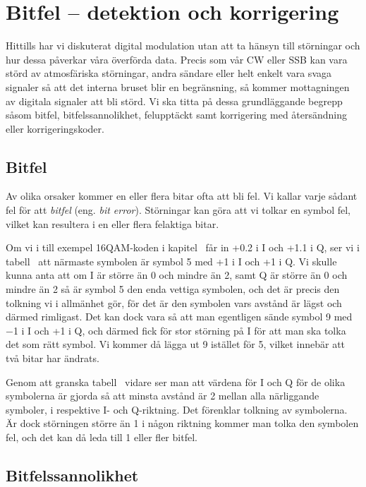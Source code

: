 \section{Bitfel -- detektion och korrigering}

Hittills har vi diskuterat digital modulation utan att ta hänsyn till störningar
och hur dessa påverkar våra överförda data.
Precis som vår CW eller SSB kan vara störd av atmosfäriska störningar, andra
sändare eller helt enkelt vara svaga signaler så att det interna bruset blir en
begränsning, så kommer mottagningen av digitala signaler att bli störd.
Vi ska titta på dessa grundläggande begrepp såsom bitfel, bitfelssannolikhet,
felupptäckt samt korrigering med återsändning eller korrigeringskoder.

\subsection{Bitfel}

Av olika orsaker kommer en eller flera bitar ofta att bli fel.
Vi kallar varje sådant fel för att \emph{bitfel} (eng. \emph{bit error}).
Störningar kan göra att vi tolkar en symbol fel, vilket kan resultera i en eller
flera felaktiga bitar.

Om vi i till exempel 16QAM-koden i kapitel~ får in +0.2 i I och +1.1
i Q, ser vi i tabell~ att närmaste symbolen är symbol 5 med +1
i I och +1 i Q.
Vi skulle kunna anta att om I är större än 0 och mindre än 2, samt Q är större
än 0 och mindre än 2 så är symbol 5 den enda vettiga symbolen, och det är precis
den tolkning vi i allmänhet gör, för det är den symbolen vars avstånd är lägst
och därmed rimligast.
Det kan dock vara så att man egentligen sände symbol 9 med \num{-1} i I och +1 i
Q, och därmed fick för stor störning på I för att man ska tolka det som rätt
symbol.
Vi kommer då lägga ut 9 istället för 5, vilket innebär att två bitar har
ändrats.

Genom att granska tabell~ vidare ser man att värdena för
I och Q för de olika symbolerna är gjorda så att minsta avstånd är 2 mellan
alla närliggande symboler, i respektive I- och Q-riktning.
Det förenklar tolkning av symbolerna.
Är dock störningen större än 1 i någon riktning kommer man tolka den symbolen
fel, och det kan då leda till 1 eller fler bitfel.

\subsection{Bitfelssannolikhet}

